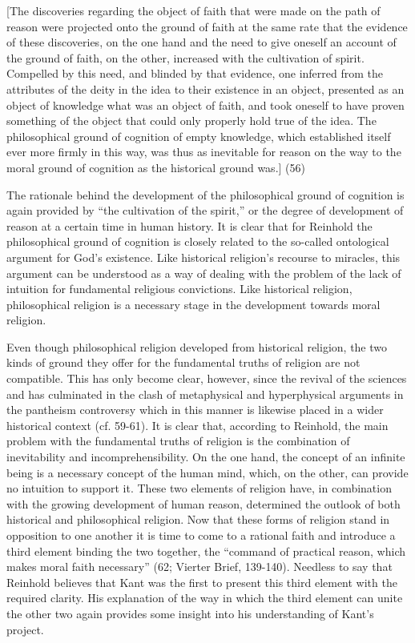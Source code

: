 [The discoveries regarding the object of faith that were made on the path of reason were projected onto the ground of faith at the same rate that the evidence of these discoveries, on the one hand and the need to give oneself an account of the ground of faith, on the other, increased with the cultivation of spirit. Compelled by this need, and blinded by that evidence, one inferred from the attributes of the deity in the idea to their existence in an object, presented as an object of knowledge what was an object of faith, and took oneself to have proven something of the object that could only properly hold true of the idea. The philosophical ground of cognition of empty knowledge, which established itself ever more firmly in this way, was thus as inevitable for reason on the way to the moral ground of cognition as the historical ground was.] (56) 

The rationale behind the development of the philosophical ground of cognition is again provided by ``the cultivation of the spirit,'' or the degree of development of reason at a certain time in human history. It is clear that for Reinhold the philosophical ground of cognition is closely related to the so{-}called ontological argument for God's existence. Like historical religion's recourse to miracles, this argument can be understood as a way of dealing with the problem of the lack of intuition for fundamental religious convictions. Like historical religion, philosophical religion is a necessary stage in the development towards moral religion. 

Even though philosophical religion developed from historical religion, the two kinds of ground they offer for the fundamental truths of religion are not compatible. This has only become clear, however, since the revival of the sciences and has culminated in the clash of metaphysical and hyperphysical arguments in the pantheism controversy which in this manner is likewise placed in a wider historical context (cf. 59{-}61). It is clear that, according to Reinhold, the main problem with the fundamental truths of religion is the combination of inevitability and incomprehensibility. On the one hand, the concept of an infinite being is a necessary concept of the human mind, which, on the other, can provide no intuition to support it. These two elements of religion have, in combination with the growing development of human reason, determined the outlook of both historical and philosophical religion. Now that these forms of religion stand in opposition to one another it is time to come to a rational faith and introduce a third element binding the two together, the ``command of practical reason, which makes moral faith necessary'' (62; Vierter Brief, 139{-}140). Needless to say that Reinhold believes that Kant was the first to present this third element with the required clarity. His explanation of the way in which the third element can unite the other two again provides some insight into his understanding of Kant's project. 


